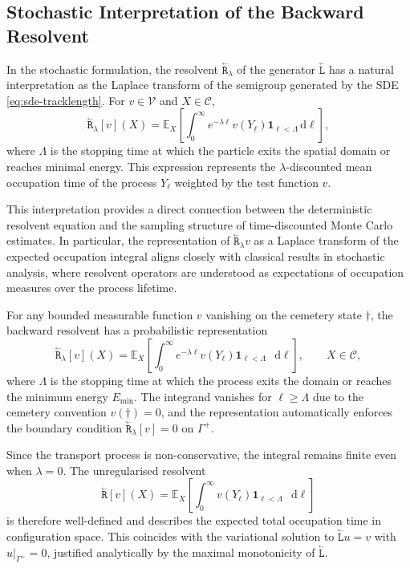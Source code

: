 \documentclass{amsart}
\newcommand{\dd}{{\mathrm d}}
\newcommand{\bL}{\stackrel{_\leftarrow}{\mathtt L}}
\newcommand{\bR}{\stackrel{_\leftarrow}{\mathtt R}}
\theoremstyle{plain}
\newcommand{\cV}{\ensuremath{\mathscr V}}
\renewcommand{\d}{\mathop{}\!\mathrm{d}}
\begin{document}
\subsection*{Stochastic Interpretation of the Backward Resolvent}

In the stochastic formulation, the resolvent $\bR_\lambda$ of the
generator $\bL$ has a natural interpretation as the Laplace transform
of the semigroup generated by the SDE \eqref{eq:sde-tracklength}. For
$v \in \cV$ and $X \in \mathcal{C}$,
\begin{equation}
  \bR_\lambda [v](X) = \mathbb{E}_X \left[ \int_0^\infty e^{-\lambda \ell} v(Y_\ell) \mathbf{1}_{\ell < \Lambda} \, \dd \ell \right],
\end{equation}
where $\Lambda$ is the stopping time at which the particle exits the
spatial domain or reaches minimal energy. This expression represents
the $\lambda$-discounted mean occupation time of the process $Y_\ell$
weighted by the test function $v$. 

This interpretation provides a direct connection between the
deterministic resolvent equation and the sampling structure of
time-discounted Monte Carlo estimates. In particular, the
representation of $\bR_\lambda v$ as a Laplace transform of the
expected occupation integral aligns closely with classical results in
stochastic analysis, where resolvent operators are understood as
expectations of occupation measures over the process lifetime.

For any bounded measurable function $v$ vanishing on the cemetery
state $\dagger$, the backward resolvent has a probabilistic
representation
\begin{equation}
  \bR_\lambda[v](X)
  =
  \mathbb{E}_X\left[ \int_0^\infty e^{-\lambda \ell} v(Y_\ell) \mathbf{1}_{\ell < \Lambda} \, \d \ell \right], \qquad X \in \mathcal{C},
  \label{probabilityresolvent}
\end{equation}
where $\Lambda$ is the stopping time at which the process exits the
domain or reaches the minimum energy $E_{\min}$. The integrand
vanishes for $\ell \ge \Lambda$ due to the cemetery convention
$v(\dagger) = 0$, and the representation automatically enforces the
boundary condition $\bR_\lambda[v] = 0$ on $\Gamma^+$.

Since the transport process is non-conservative, the integral remains
finite even when $\lambda = 0$. The unregularised resolvent
\begin{equation}
  \bR[v](X)
  =
  \mathbb{E}_X\left[ \int_0^\infty v(Y_\ell) \mathbf{1}_{\ell < \Lambda} \, \d \ell \right]
  \label{resolventdef}
\end{equation}
is therefore well-defined and describes the expected total occupation
time in configuration space. This coincides with the variational
solution to $\bL u = v$ with $u|_{\Gamma^+} = 0$, justified
analytically by the maximal monotonicity of $\bL$.
\end{document}
